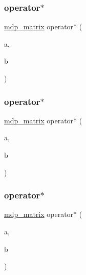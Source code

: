 \subsubsection{\texorpdfstring{operator$\ast$}{operator*}\hspace{0.1cm}{\footnotesize\ttfamily [1/5]}}
{\footnotesize\ttfamily \hyperlink{classmdp__matrix}{mdp\+\_\+matrix} operator$\ast$ (\begin{DoxyParamCaption}\item[{const \hyperlink{classmdp__matrix}{mdp\+\_\+matrix} \&}]{a,  }\item[{const \hyperlink{classmdp__matrix}{mdp\+\_\+matrix} \&}]{b }\end{DoxyParamCaption})\hspace{0.3cm}{\ttfamily [friend]}}

\mbox{\label{classmdp__matrix_a0fc0749acc8f2a3f26f0daf14797a9e5}} 
\subsubsection{\texorpdfstring{operator$\ast$}{operator*}\hspace{0.1cm}{\footnotesize\ttfamily [2/5]}}
{\footnotesize\ttfamily \hyperlink{classmdp__matrix}{mdp\+\_\+matrix} operator$\ast$ (\begin{DoxyParamCaption}\item[{const \hyperlink{classmdp__matrix}{mdp\+\_\+matrix} \&}]{a,  }\item[{\hyperlink{classmdp__complex}{mdp\+\_\+complex}}]{b }\end{DoxyParamCaption})\hspace{0.3cm}{\ttfamily [friend]}}

\mbox{\label{classmdp__matrix_a99f6d1150215e2cb7b00de4b6aa04633}} 
\subsubsection{\texorpdfstring{operator$\ast$}{operator*}\hspace{0.1cm}{\footnotesize\ttfamily [3/5]}}
{\footnotesize\ttfamily \hyperlink{classmdp__matrix}{mdp\+\_\+matrix} operator$\ast$ (\begin{DoxyParamCaption}\item[{\hyperlink{classmdp__complex}{mdp\+\_\+complex}}]{a,  }\item[{const \hyperlink{classmdp__matrix}{mdp\+\_\+matrix} \&}]{b }\end{DoxyParamCaption})\hspace{0.3cm}{\ttfamily [friend]}}


